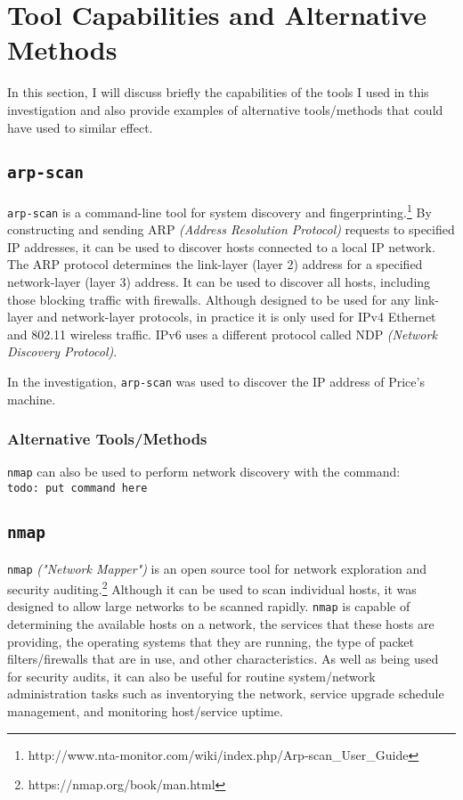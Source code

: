 \documentclass[12pt]{report}
\newcommand{\term}[1]{\colorbox{light-gray}{\texttt{#1}}}
\begin{document}
\pagebreak
\chapter{Tool Capabilities and Alternative Methods}
In this section, I will discuss briefly the capabilities of the tools I used in this investigation and also provide examples of alternative tools/methods that could have used to similar effect.

\section{\texttt{arp-scan}}
\texttt{arp-scan} is a command-line tool for system discovery and fingerprinting.\footnote{http://www.nta-monitor.com/wiki/index.php/Arp-scan\_User\_Guide} By constructing and sending ARP \textit{(Address Resolution Protocol)} requests to specified IP addresses, it can be used to discover hosts connected to a local IP network. The ARP protocol determines the link-layer (layer 2) address for a specified network-layer (layer 3) address. It can be used to discover all hosts, including those blocking traffic with firewalls. Although designed to be used for any link-layer and network-layer protocols, in practice it is only used for IPv4 Ethernet and 802.11 wireless traffic. IPv6 uses a different protocol called NDP \textit{(Network Discovery Protocol)}.

In the investigation, \texttt{arp-scan} was used to discover the IP address of Price's machine.
\subsection*{Alternative Tools/Methods}
\texttt{nmap} can also be used to perform network discovery with the command:\\
\term{todo: put command here}

\section{\texttt{nmap}}
\texttt{nmap} \textit{("Network Mapper")} is an open source tool for network exploration and security auditing.\footnote{https://nmap.org/book/man.html} Although it can be used to scan individual hosts, it was designed to allow large networks to be scanned rapidly. \texttt{nmap} is capable of determining the available hosts on a network, the services that these hosts are providing, the operating systems that they are running, the type of packet filters/firewalls that are in use, and other characteristics. As well as being used for security audits, it can also be useful for routine system/network administration tasks such as inventorying the network, service upgrade schedule management, and monitoring host/service uptime.
\end{document}
